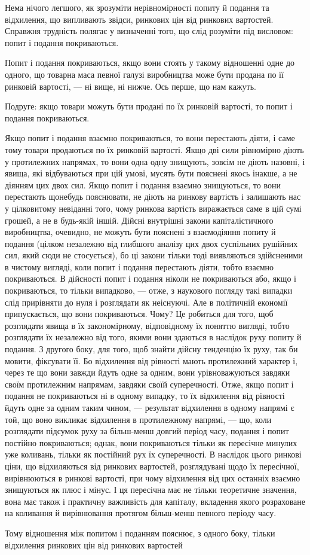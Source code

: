 Нема нічого легшого, як зрозуміти нерівномірності попиту
й подання та відхилення, що випливають звідси, ринкових цін
від ринкових вартостей. Справжня трудність полягає у визначенні
того, що слід розуміти під висловом: попит і подання
покриваються.

Попит і подання покриваються, якщо вони стоять у такому
відношенні одне до одного, що товарна маса певної галузі виробництва
може бути продана по її ринковій вартості, — ні вище,
ні нижче. Ось перше, що нам кажуть.

Подруге: якщо товари можуть бути продані по їх ринковій
вартості, то попит і подання покриваються.

Якщо попит і подання взаємно покриваються, то вони перестають
діяти, і саме тому товари продаються по їх ринковій вартості.
Якщо дві сили рівномірно діють у протилежних напрямах,
то вони одна одну знищують, зовсім не діють назовні, і явища,
які відбуваються при цій умові, мусять бути пояснені якось
інакше, а не діянням цих двох сил. Якщо попит і подання взаємно
знищуються, то вони перестають щонебудь пояснювати,
не діють на ринкову вартість і залишають нас у цілковитому
невіданні того, чому ринкова вартість виражається саме в цій
сумі грошей, а не в будь-якій іншій. Дійсні внутрішні закони
капіталістичного виробництва, очевидно, не можуть бути пояснені
з взаємодіяння попиту й подання (цілком незалежно від
глибшого аналізу цих двох суспільних рушійних сил, який сюди
не стосується), бо ці закони тільки тоді виявляються здійсненими
в чистому вигляді, коли попит і подання перестають
діяти, тобто взаємно покриваються. В дійсності попит і подання
ніколи не покриваються або, якщо і покриваються, то тільки
випадково, — отже, з наукового погляду такі випадки слід прирівняти
до нуля і розглядати як неіснуючі. Але в політичній
економії припускається, що вони покриваються. Чому? Це робиться
для того, щоб розглядати явища в їх закономірному, відповідному
їх поняттю вигляді, тобто розглядати їх незалежно від
того, якими вони здаються в наслідок руху попиту й подання.
З другого боку, для того, щоб знайти дійсну тенденцію їх руху, так
би мовити, фіксувати її. Бо відхилення від рівності мають протилежний
характер і, через те що вони завжди йдуть одне за одним,
вони урівноважуються завдяки своїм протилежним напрямам, завдяки
своїй суперечності. Отже, якщо попит і подання не покриваються
ні в одному випадку, то їх відхилення від рівності йдуть одне
за одним таким чином, — результат відхилення в одному напрямі
є той, що воно викликає відхилення в протилежному напрямі, —
що, коли розглядати підсумок руху за більш-менш довгий період
часу, подання і попит постійно покриваються; однак, вони покриваються
тільки як пересічне минулих уже коливань, тільки як
постійний рух їх суперечності. В наслідок цього ринкові ціни,
що відхиляються від ринкових вартостей, розглядувані щодо
їх пересічної, вирівнюються в ринкові вартості, при чому відхилення
від цих останніх взаємно знищуються як плюс і мінус.
І ця пересічна має не тільки теоретичне значення, вона має
також і практичну важливість для капіталу, вкладення якого розраховане
на коливання й вирівнювання протягом більш-менш певного
періоду часу.

Тому відношення між попитом і поданням пояснює, з одного
боку, тільки відхилення ринкових цін від ринкових вартостей
\parbreak{}  %
